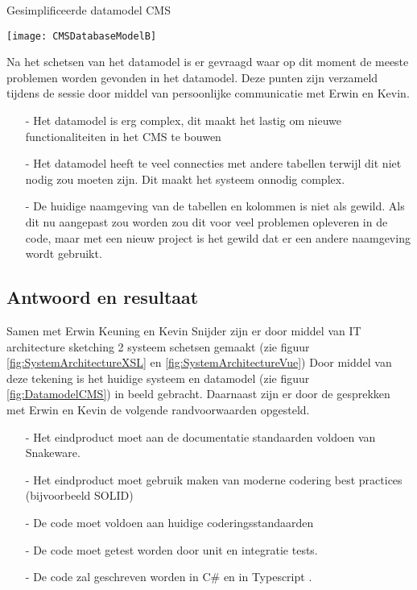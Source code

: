 \whitespace
\begin{graphic}
	\captionsetup{type=figure}
	\caption{Gesimplificeerde datamodel CMS}
	\texttt{[image: CMSDatabaseModelB]}
	\label{fig:DatamodelCMS}
\end{graphic}

\whitespace[2]
Na het schetsen van het datamodel is er gevraagd waar op dit moment de meeste problemen worden gevonden in het datamodel.
Deze punten zijn verzameld tijdens de sessie door middel van persoonlijke communicatie met Erwin en Kevin.
\begin{itemize}
	\item[-]{Het datamodel is erg complex, dit maakt het lastig om nieuwe functionaliteiten in het CMS te bouwen}
	\item[-]{Het datamodel heeft te veel connecties met andere tabellen terwijl dit niet nodig zou moeten zijn.
	      Dit maakt het systeem onnodig complex.}
	\item[-]{De huidige naamgeving van de tabellen en kolommen is niet als gewild.
	      Als dit nu aangepast zou worden zou dit voor veel problemen opleveren in de code, maar met een nieuw project is het gewild dat er een andere naamgeving wordt gebruikt.}
\end{itemize}
%

\subsection{Antwoord en resultaat}
Samen met Erwin Keuning en Kevin Snijder zijn er door middel van IT architecture sketching 2 systeem schetsen gemaakt (zie figuur \ref{fig:SystemArchitectureXSL} en \ref{fig:SystemArchitectureVue})
Door middel van deze tekening is het huidige systeem en datamodel (zie figuur \ref{fig:DatamodelCMS}) in beeld gebracht.
Daarnaast zijn er door de gesprekken met Erwin en Kevin de volgende randvoorwaarden opgesteld.

\begin{itemize}
	\item[-]{Het eindproduct moet aan de documentatie standaarden voldoen van Snakeware.}
	\item[-]{Het eindproduct moet gebruik maken van moderne codering best practices (bijvoorbeeld SOLID)}
	\item[-]{De code moet voldoen aan huidige coderingsstandaarden}
	\item[-]{De code moet getest worden door unit en integratie tests.}
    \item[-]{De code zal geschreven worden in C\# \Parencite{CSharp} en in Typescript \Parencite{Typescript}.}
\end{itemize}

